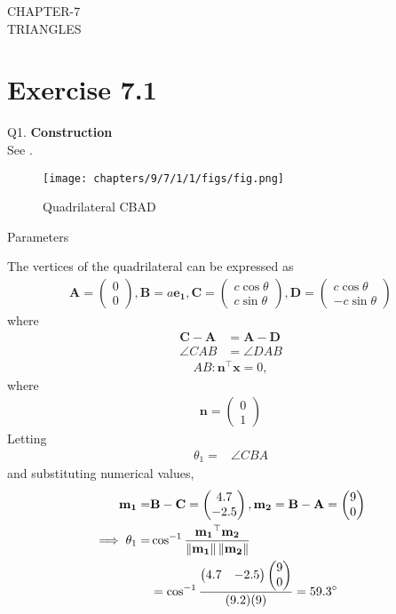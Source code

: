 \documentclass{article}
\providecommand{\norm}[1]{\left\lVert#1\right\rVert}
\newcommand{\myvec}[1]{\ensuremath{\begin{pmatrix}#1\end{pmatrix}}}
\let\vec\mathbf
\begin{document}
\begin{center}
        \textbf\large{CHAPTER-7 \\ TRIANGLES}
\end{center}
\section{Exercise 7.1}
Q1. \textbf{Construction}\\
\fi
See 
	  .
\begin{figure}[H]
	\begin{center}
		\texttt{[image: chapters/9/7/1/1/figs/fig.png]}
	\end{center}
	\caption{Quadrilateral CBAD}
	\label{fig:chapters/9/7/1/1/Fig1}
\end{figure}
\begin{table}[H]
	  \centering
	  
	  \caption{Parameters}
	  \label{tab:9/7/1/1/Table1}
\end{table}
The vertices of the quadrilateral can be expressed as
\begin{align}
	\vec{A} = \myvec{0\\0},\vec{B} = a\vec{e_1},\vec{C} = \myvec{c\cos\theta\\c\sin\theta},\vec{D} = \myvec{c\cos\theta\\-c\sin\theta}
\end{align}
where
\begin{align}
	\vec{C}-\vec{A} &= \vec{A}-\vec{D}\\
	\angle{CAB} &= \angle{DAB}
\end{align}
\begin{align}
	AB:	\vec{n}^{\top}\vec{x} = 0,
\end{align}
where
\begin{align}
\vec{n} = \myvec{0\\1}
\end{align}
Letting
		\begin{align}
\theta_1=&\angle CBA 
		\end{align}
		and substituting numerical values,
		\begin{align}
\vec{m_1}=&\vec{B}-\vec{C}=\myvec{4.7\\-2.5}, \vec{m_2}=\vec{B}-\vec{A}=\myvec{9\\0}\\
\implies \theta_1=&\cos^{-1}\frac{\vec{m_1}^\top\vec{m_2}}{\norm{\vec{m_1}}\norm{\vec{m_2}}}\\
&=\cos^{-1}\frac{\myvec{4.7&-2.5}\myvec{9\\0}}{(9.2)(9)}=59.3\degree
\label{eq:chapters/9/7/1/1/1}
		\end{align}
\end{document}
